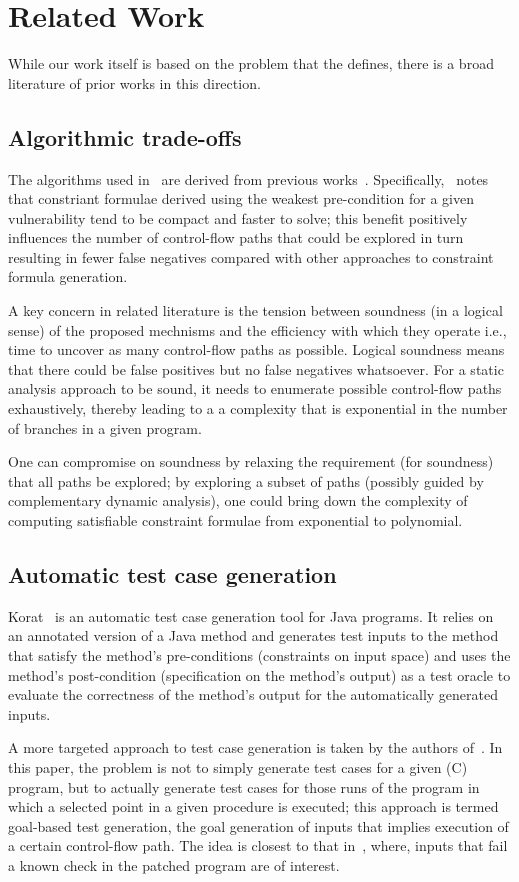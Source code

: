 \section{Related Work} \label{rel_work}
While our work itself is based on the problem that the \ap defines, there is a broad literature of prior works in this direction.

\subsection{Algorithmic trade-offs}
The algorithms used in~\cite{apeg08} are derived from previous works~\cite{brumley06,brumley07}. Specifically,~\cite{brumley07} notes that constriant formulae derived using the weakest pre-condition for a given vulnerability tend to be compact and faster to solve; this benefit positively influences the number of control-flow paths that could be explored in turn resulting in fewer false negatives compared with other approaches to constraint formula generation.

A key concern in related literature is the tension between soundness (in a logical sense) of the proposed mechnisms and the efficiency with which they operate i.e., time to uncover as many control-flow paths as possible. Logical soundness means that there could be false positives but no false negatives whatsoever. For a static analysis approach to be sound, it needs to enumerate possible control-flow paths exhaustively, thereby leading to a a complexity that is exponential in the number of branches in a given program.

One can compromise on soundness by relaxing the requirement (for soundness) that all paths be explored; by exploring a subset of paths (possibly guided by complementary dynamic analysis), one could bring down the complexity of computing satisfiable constraint formulae from exponential to polynomial.

\subsection{Automatic test case generation}
Korat~\cite{korat} is an automatic test case generation tool for Java programs. It relies on an annotated version of a Java method and generates test inputs to the method that satisfy the method's pre-conditions (constraints on input space) and uses the method's post-condition (specification on the method's output) as a test oracle to evaluate the correctness of the method's output for the automatically generated inputs.

A more targeted approach to test case generation is taken by the authors of~\cite{gotlieb}. In this paper, the problem is not to simply generate test cases for a given (C) program, but to actually generate test cases for those runs of the program in which a selected point in a given procedure is executed; this approach is termed goal-based test generation, the goal generation of inputs that implies execution of a certain control-flow path. The idea is closest to that in~\cite{apeg08}, where, inputs that fail a known check in the patched program are of interest.
